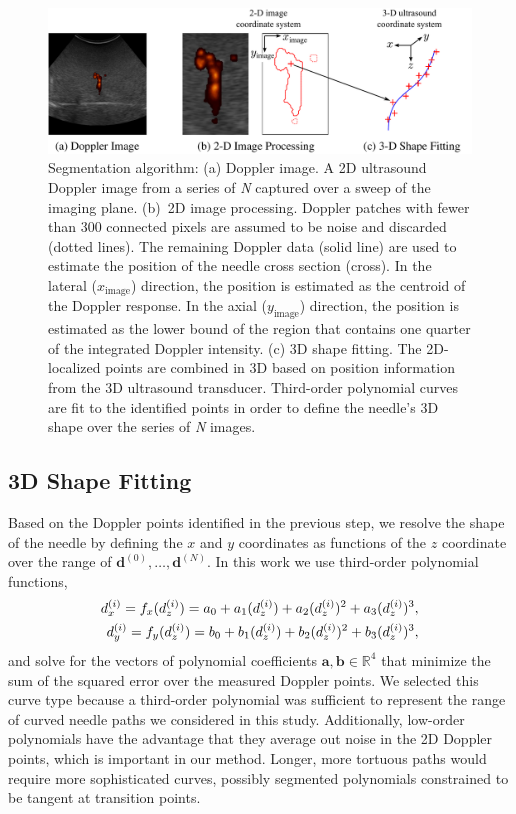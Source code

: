 \begin{figure}[!t]
\centering
\includegraphics[width = \textwidth]{Images/Chapter2/Segmentation/Segmentation}%
\caption[Doppler ultrasound segmentation algorithm]{Segmentation algorithm: (a) Doppler image. A 2D ultrasound Doppler image from a series of \textit{N} captured over a sweep of the imaging plane. (b)~2D image processing. Doppler patches with fewer than 300 connected pixels are assumed to be noise and discarded (dotted lines). The remaining Doppler data (solid line) are used to estimate the position of the needle cross section (cross). In the lateral ($x_\text{image}$) direction, the position is estimated as the centroid of the Doppler response. In the axial ($y_\text{image}$) direction, the position is estimated as the lower bound of the region that contains one quarter of the integrated Doppler intensity. (c) 3D shape fitting. The 2D-localized points are combined in 3D based on position information from the 3D ultrasound transducer. Third-order polynomial curves are fit to the identified points in order to define the needle's 3D shape over the series of \textit{N} images.}
\label{fig:Segmentation}
\end{figure}

\subsection{3D Shape Fitting}
Based on the Doppler points identified in the previous step, we resolve the shape of the needle by defining the $x$ and $y$ coordinates as functions of the $z$ coordinate over the range of $\bm{d}^{(0)}, \dotsc, \bm{d}^{(N)}$. In this work we use third-order polynomial functions,
\begin{align}
d^{(i)}_x = f_x(d_z^{(i)}) = a_0 + a_1(d_z^{(i)}) + a_2(d_z^{(i)})^{2} + a_3(d_z^{(i)})^{3},\notag\\
d^{(i)}_y = f_y(d_z^{(i)}) = b_0 + b_1(d_z^{(i)}) + b_2(d_z^{(i)})^{2} + b_3(d_z^{(i)})^{3},\label{result}
\end{align}
and solve for the vectors of polynomial coefficients $\bm{a},\bm{b} \in \mathbb{R}^{4}$ that minimize the sum of the squared error over the measured Doppler points. We selected this curve type because a third-order polynomial was sufficient to represent the range of curved needle paths we considered in this study. Additionally, low-order polynomials have the advantage that they average out noise in the 2D Doppler points, which is important in our method. Longer, more tortuous paths would require more sophisticated curves, possibly segmented polynomials constrained to be tangent at transition points.

